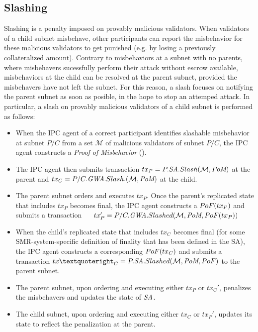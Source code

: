 \subsection{Slashing}
Slashing is a penalty imposed on provably malicious validators. When validators of a child subnet misbehave, other participants can report the misbehavior for these malicious validators to get punished (e.g. by losing a previously collateralized amount). Contrary to misbehaviors at a subnet with no parents, where misbehavers sucessfully perform their attack without escrow available, misbehaviors at the child can be resolved at the parent subnet, provided the misbehavers have not left the subnet.  For this reason, a slash focuses on notifying the parent subnet as soon as posible, in the hope to stop an attemped attack. In particular, a slash on provably malicious validators of a child subnet is performed as follows:
\begin{itemize}
    \item When the IPC agent of a correct participant identifies slashable misbehavior at subnet $P/C$ from a set $\mathcal{M}$ of malicious validators of subnet $P/C$, the IPC agent constructs a \textit{Proof of Misbehavior} (\pom). \item The IPC agent then submits transaction $tx_P=P.\textit{SA}.Slash(\mathcal{M}, \textit{PoM})$ at the parent and $tx_C=P/C.\textit{GWA}.Slash.(\mathcal{M}, \textit{PoM})$ at the child.
    \item The parent subnet orders and executes $tx_P$. Once the parent's replicated state that includes $tx_P$ becomes final, the IPC agent constructs a $PoF(tx_P)$ and submits a transaction $\>\>\>\>\>\>$$tx'_P=P/C.\textit{GWA}.Slashed(\mathcal{M}, \textit{PoM}, PoF(tx_P))$
    \item When the child’s replicated state that includes $tx_C$ becomes final (for some SMR-system-specific definition of finality that has been defined in the SA), the IPC agent constructs a corresponding $PoF(tx_C)$ and submits a transaction $tx’_C = P.\sa.Slashed(\mathcal{M}, \pom, PoF)$ to the parent subnet.
    \item The parent subnet, upon ordering and executing either $tx_P$ or $tx_C'$, penalizes the misbehavers and updates the state of $\textit{SA}$. 
    \item The child subnet, upon ordering and executing either $tx_C$ or $tx_P'$, updates its state to reflect the penalization at the parent.  
\end{itemize}
